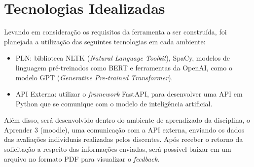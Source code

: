 \section{Tecnologias Idealizadas}

Levando em consideração os requisitos da ferramenta a ser construída, foi planejada a utilização das seguintes tecnologias em cada ambiente:

\begin{itemize}
  \item PLN: biblioteca NLTK (\textit{Natural Language Toolkit}), SpaCy, modelos de linguagem pré-treinados como BERT e ferramentas da OpenAI, como o modelo GPT (\textit{Generative Pre-trained Transformer}).
  \item API Externa: utilizar o \textit{framework} FastAPI, para desenvolver uma API em Python que se comunique com o modelo de inteligência artificial.
\end{itemize}

Além disso, será desenvolvido dentro do ambiente de aprendizado da disciplina, o Aprender 3 (moodle), uma comunicação com a API externa, enviando os dados das avaliações individuais realizadas pelos discentes. Após receber o retorno da solicitação a respeito das informações enviadas, será possível baixar em um arquivo no formato PDF para visualizar o \textit{feedback}.
